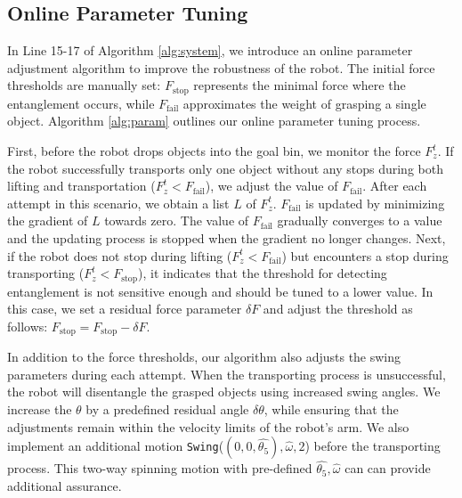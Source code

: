 \documentclass[letterpaper, 10 pt, conference]{ieeeconf}
\begin{document}
\subsection{Online Parameter Tuning}

    In Line 15-17 of Algorithm \ref{alg:system}, we introduce an online parameter adjustment algorithm to improve the robustness of the robot. The initial force thresholds are manually set: $F_\text{stop}$ represents the minimal force where the entanglement occurs, while $F_\text{fail}$ approximates the weight of grasping a single object. Algorithm \ref{alg:param} outlines our online parameter tuning process.

    First, before the robot drops objects into the goal bin, we monitor the force $F_z^t$. If the robot successfully transports only one object without any stops during both lifting and transportation ($F_z^t<F_\text{fail}$), we adjust the value of $F_\text{fail}$. After each attempt in this scenario, we obtain a list $L$ of $F_z^t$. $F_\text{fail}$ is updated by minimizing the gradient of $L$ towards zero. The value of $F_\text{fail}$ gradually converges to a value and the updating process is stopped when the gradient no longer changes. Next, if the robot does not stop during lifting ($F_z^t<F_\text{fail}$) but encounters a stop during transporting ($F_z^t<F_\text{stop}$), it indicates that the threshold for detecting entanglement is not sensitive enough and should be tuned to a lower value. In this case, we set a residual force parameter $\delta F$ and adjust the threshold as follows: $F_\text{stop}=F_\text{stop}-\delta F$.

    In addition to the force thresholds, our algorithm also adjusts the swing parameters during each attempt. When the transporting process is unsuccessful, the robot will disentangle the grasped objects using increased swing angles. We increase the $\theta$ by a predefined residual angle $\delta \theta$, while ensuring that the adjustments remain within the velocity limits of the robot's arm. We also implement an additional motion \texttt{Swing}($(0,0,\hat{\theta_5}),\hat{\omega},2$) before the transporting process. This two-way spinning motion with pre-defined $\hat{\theta_5},\hat{\omega}$ can can provide additional assurance.


\end{document}
